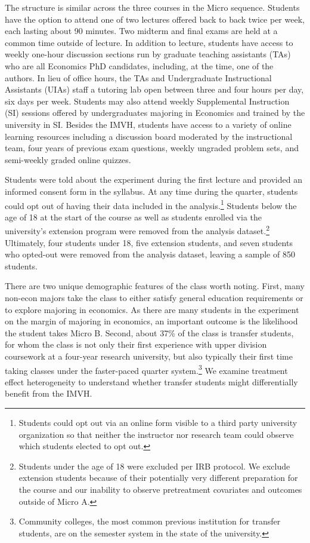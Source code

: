 \documentclass[12pt]{article}
\begin{document}

The structure is similar across the three courses in the Micro sequence. Students have the option to attend one of two lectures offered back to back twice per week, each lasting about 90 minutes. Two midterm and final exams are held at a common time outside of lecture. In addition to lecture, students have access to weekly one-hour discussion sections run by graduate teaching assistants (TAs) who are all Economics PhD candidates, including, at the time, one of the authors. In lieu of office hours, the TAs and Undergraduate Instructional Assistants (UIAs) staff a tutoring lab open between three and four hours per day, six days per week. Students may also attend weekly Supplemental Instruction (SI) sessions offered by undergraduates majoring in Economics and trained by the university in SI. Besides the IMVH, students have access to a variety of online learning resources including a discussion board moderated by the instructional team, four years of previous exam questions, weekly ungraded problem sets, and semi-weekly graded online quizzes.



Students were told about the experiment during the first lecture and provided an informed consent form in the syllabus. At any time during the quarter, students could opt out of having their data included in the analysis.\footnote{Students could opt out via an online form visible to a third party university organization so that neither the instructor nor research team could observe which students elected to opt out.} Students below the age of 18 at the start of the course as well as students enrolled via the university's extension program were removed from the analysis dataset.\footnote{Students under the age of 18 were excluded per IRB protocol. We exclude extension students because of their potentially very different preparation for the course and our inability to observe pretreatment covariates and outcomes outside of Micro A.} Ultimately, four students under 18, five extension students, and seven students who opted-out were removed from the analysis dataset, leaving a sample of 850 students.

There are two unique demographic features of the class worth noting. First, many non-econ majors take the class to either satisfy general education requirements or to explore majoring in economics. As there are many students in the experiment on the margin of majoring in economics, an important outcome is the likelihood the student takes Micro B. Second, about 37\% of the class is transfer students, for whom the class is not only their first experience with upper division coursework at a four-year research university, but also typically their first time taking classes under the faster-paced quarter system.\footnote{Community colleges, the most common previous institution for transfer students, are on the semester system in the state of the university.} We examine treatment effect heterogeneity to understand whether transfer students might differentially benefit from the IMVH.
\end{document}
